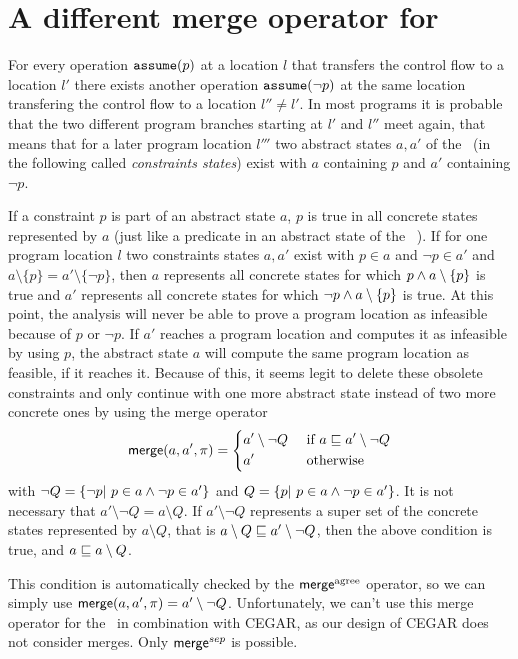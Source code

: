 \section{A different merge operator for \constraintsCPA}
\label{sec:newMerge}
For every operation $\texttt{assume}(p)$ at a location $l$ that transfers the control flow to a location $l'$ there exists another operation $\texttt{assume}(\neg p)$ at the same location transfering the control flow to a location $l'' \neq l'$.
In most programs it is probable that the two different program branches starting at $l'$ and $l''$ meet again, that means that for a later program location $l'''$ two abstract states $a, a'$ of the \constraintsCPA\ (in the following  called \emph{constraints states}) exist with $a$ containing $p$ and $a'$ containing $\neg p$.

If a constraint $p$ is part of an abstract state $a$, $p$ is true in all concrete states represented by $a$ (just like a predicate in an abstract state of the \predicateCPA\ \cite{Beyer2008}).
If for one program location $l$ two constraints states $a, a'$ exist with $p \in a$ and $\neg p \in a'$ and $a \setminus \{ p \} = a' \setminus \{ \neg p \}$,
then $a$ represents all concrete states for which $p \wedge a \setminus \{ p \}$ is true and $a'$ represents all concrete states for which $\neg p \wedge a \setminus \{ p \}$ is true.
At this point, the analysis will never be able to prove a program location as infeasible because of $p$ or $\neg p$.
If $a'$ reaches a program location and computes it as infeasible by using $p$, the abstract state $a$ will compute the same program location as feasible, if it reaches it.
Because of this, it seems legit to delete these obsolete constraints and only continue with one more abstract state instead of two more concrete ones by using the merge operator
\[ \operatorname{\operatorname{\mathsf{merge}}} (a, a', \pi) = \begin{dcases}
a' \setminus \neg Q & \text{ if } a \sqsubseteq a' \setminus \neg Q \\
a' & \text{ otherwise}
\end{dcases} \]
with $\neg Q = \{\neg p |\ p \in a \wedge \neg p \in a' \}$ and $Q = \{ p |\ p \in a \wedge \neg p \in a' \}$.
It is not necessary that $a' \setminus \neg Q = a \setminus Q$.
If $a' \setminus \neg Q$ represents a super set of the concrete states represented by $a \setminus Q$, that is $a \setminus Q \sqsubseteq a' \setminus \neg Q$, then the above condition is true, and $a \sqsubseteq a \setminus Q$.

This condition is automatically checked by the $\operatorname{{\operatorname{\operatorname{\mathsf{merge}}}^{agree}}}$ operator, so we can simply use $\operatorname{\operatorname{\mathsf{merge}}}(a, a', \pi) = a' \setminus \neg Q$.
Unfortunately, we can't use this merge operator for the \constraintsCPA\ in combination with CEGAR, as our design of CEGAR does not consider merges.
Only $\operatorname{\operatorname{\mathsf{merge}}}^{sep}$ is possible.
